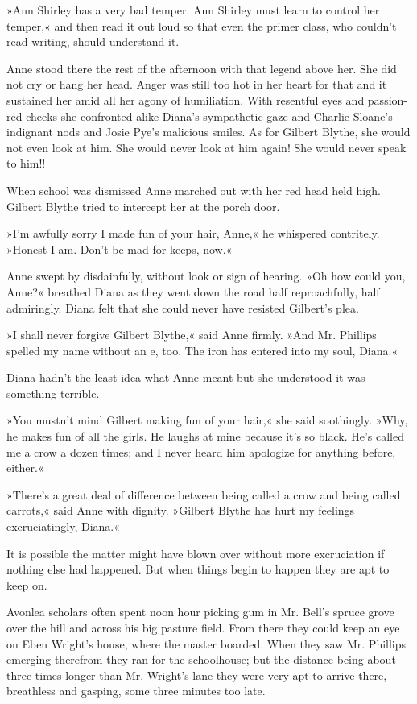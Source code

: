»Ann Shirley has a very bad temper. Ann Shirley must learn to control her temper,« and then read it out loud so that even the primer class, who couldn't read writing, should understand it.

Anne stood there the rest of the afternoon with that legend above her. She did not cry or hang her head. Anger was still too hot in her heart for that and it sustained her amid all her agony of humiliation. With resentful eyes and passion-red cheeks she confronted alike Diana's sympathetic gaze and Charlie Sloane's indignant nods and Josie Pye's malicious smiles. As for Gilbert Blythe, she would not even look at him. She would never look at him again! She would never speak to him!!

When school was dismissed Anne marched out with her red head held high. Gilbert Blythe tried to intercept her at the porch door.

»I'm awfully sorry I made fun of your hair, Anne,« he whispered contritely. »Honest I am. Don't be mad for keeps, now.«

Anne swept by disdainfully, without look or sign of hearing. »Oh how could you, Anne?« breathed Diana as they went down the road half reproachfully, half admiringly. Diana felt that she could never have resisted Gilbert's plea.

»I shall never forgive Gilbert Blythe,« said Anne firmly. »And Mr. Phillips spelled my name without an e, too. The iron has entered into my soul, Diana.«

Diana hadn't the least idea what Anne meant but she understood it was something terrible.

»You mustn't mind Gilbert making fun of your hair,« she said soothingly. »Why, he makes fun of all the girls. He laughs at mine because it's so black. He's called me a crow a dozen times; and I never heard him apologize for anything before, either.«

»There's a great deal of difference between being called a crow and being called carrots,« said Anne with dignity. »Gilbert Blythe has hurt my feelings excruciatingly, Diana.«

It is possible the matter might have blown over without more excruciation if nothing else had happened. But when things begin to happen they are apt to keep on.

Avonlea scholars often spent noon hour picking gum in Mr. Bell's spruce grove over the hill and across his big pasture field. From there they could keep an eye on Eben Wright's house, where the master boarded. When they saw Mr. Phillips emerging therefrom they ran for the schoolhouse; but the distance being about three times longer than Mr. Wright's lane they were very apt to arrive there, breathless and gasping, some three minutes too late.

